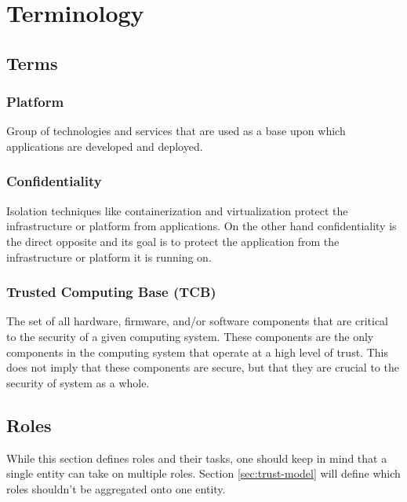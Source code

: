 \chapter{Terminology}

\section{Terms}

\subsection{Platform}

Group of technologies and services that are used as a base upon which
applications are developed and deployed.


\subsection{Confidentiality}
\label{sec:confidentiality}

Isolation techniques like containerization and virtualization protect the
infrastructure or platform from applications. On the other hand confidentiality
is the direct opposite and its goal is to protect the application from the
infrastructure or platform it is running on.

\subsection{Trusted Computing Base (TCB)}

The set of all hardware, firmware, and/or software components that are critical
to the security of a given computing system. These components are the only
components in the computing system that operate at a high level of trust. This
does not imply that these components are secure, but that they are crucial to the
security of system as a whole.

\section{Roles}

While this section defines roles and their tasks, one should keep in mind that a
single entity can take on multiple roles. Section \ref{sec:trust-model} will
define which roles shouldn't be aggregated onto one entity.

